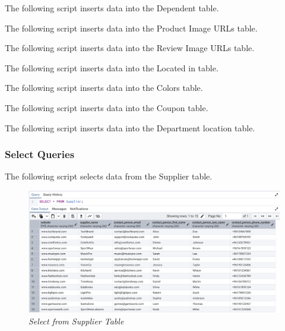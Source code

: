 The following script inserts data into the Dependent table.



The following script inserts data into the Product Image URLs table.



The following script inserts data into the Review Image URLs table.



The following script inserts data into the Located in table.



The following script inserts data into the Colors table.



The following script inserts data into the Coupon table.



The following script inserts data into the Department location table.


\subsubsection{Select Queries}

The following script selects data from the Supplier table.


\begin{figure}[H]
  \centering
  \includegraphics[width=1\textwidth]{images/sql/select/supplier.png}
  \caption{\textit{Select from Supplier Table}}
\end{figure}

